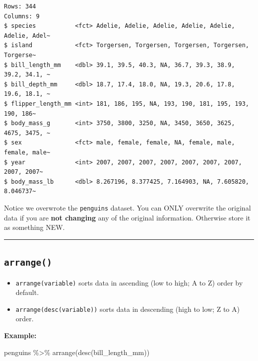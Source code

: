 \documentclass[
  letterpaper,
  DIV=11,
  numbers=noendperiod]{scrreprt}
\newenvironment{Shaded}{\begin{snugshade}}{\end{snugshade}}
\newcommand{\FunctionTok}[1]{\textcolor[rgb]{0.28,0.35,0.67}{#1}}
\newcommand{\NormalTok}[1]{\textcolor[rgb]{0.00,0.23,0.31}{#1}}
\newcommand{\SpecialCharTok}[1]{\textcolor[rgb]{0.37,0.37,0.37}{#1}}
\providecommand{\tightlist}{%
  \setlength{\itemsep}{0pt}\setlength{\parskip}{0pt}}\usepackage{longtable,booktabs,array}
\begin{document}
\begin{verbatim}
Rows: 344
Columns: 9
$ species           <fct> Adelie, Adelie, Adelie, Adelie, Adelie, Adelie, Adel~
$ island            <fct> Torgersen, Torgersen, Torgersen, Torgersen, Torgerse~
$ bill_length_mm    <dbl> 39.1, 39.5, 40.3, NA, 36.7, 39.3, 38.9, 39.2, 34.1, ~
$ bill_depth_mm     <dbl> 18.7, 17.4, 18.0, NA, 19.3, 20.6, 17.8, 19.6, 18.1, ~
$ flipper_length_mm <int> 181, 186, 195, NA, 193, 190, 181, 195, 193, 190, 186~
$ body_mass_g       <int> 3750, 3800, 3250, NA, 3450, 3650, 3625, 4675, 3475, ~
$ sex               <fct> male, female, female, NA, female, male, female, male~
$ year              <int> 2007, 2007, 2007, 2007, 2007, 2007, 2007, 2007, 2007~
$ body_mass_lb      <dbl> 8.267196, 8.377425, 7.164903, NA, 7.605820, 8.046737~
\end{verbatim}

Notice we overwrote the \texttt{penguins} dataset. You can ONLY
overwrite the original data if you are \textbf{not changing} any of the
original information. Otherwise store it as something NEW.

\begin{center}\rule{0.5\linewidth}{0.5pt}\end{center}

\hypertarget{arrange}{%
\subsection*{\texorpdfstring{\texttt{arrange()}}{arrange()}}\label{arrange}}

\begin{itemize}
\tightlist
\item
  \texttt{arrange(variable)} sorts data in ascending (low to high; A to
  Z) order by default.\\
\item
  \texttt{arrange(desc(variable))} sorts data in descending (high to
  low; Z to A) order.
\end{itemize}

\textbf{Example:}

\begin{Shaded}
\begin{Highlighting}[]
\NormalTok{penguins }\SpecialCharTok{\%\textgreater{}\%}
  \FunctionTok{arrange}\NormalTok{(}\FunctionTok{desc}\NormalTok{(bill\_length\_mm))}
\end{Highlighting}
\end{Shaded}
\end{document}

